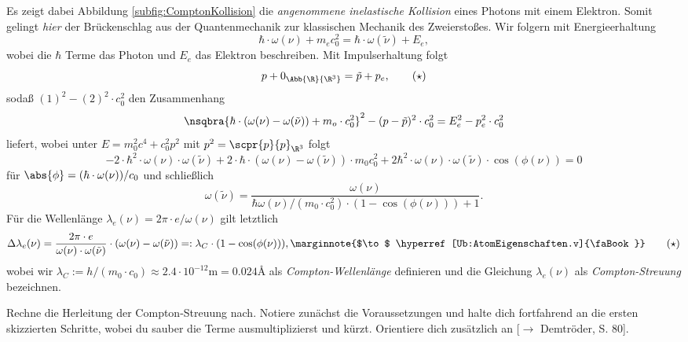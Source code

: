 \documentclass{article}
\begin{document}
        Es zeigt dabei Abbildung \ref{subfig:ComptonKollision} die \emph{angenommene inelastische Kollision} eines Photons mit einem Elektron. Somit gelingt \emph{hier} der Brückenschlag aus der Quantenmechanik zur klassischen Mechanik des Zweierstoßes. Wir folgern mit Energieerhaltung
        \[\hbar\cdot\omega(\nu) + m_ec_0^2 = \hbar\cdot\omega(\tilde\nu) + E_e,\tag{$\star$}\]
        wobei die $\hbar$ Terme das Photon und $E_e$ das Elektron beschreiben. Mit Impulserhaltung folgt
		\[p + 0_{\Abb{\R}{\R^3}} = \tilde p + p_e,\tag{$\star$}\]
        sodaß $(1)^2 - (2)^2\cdot c_0^2$ den Zusammenhang
        \[\nsqbra{\hbar\cdot(\omega(\nu)-\omega(\tilde\nu)) + m_o\cdot c_0^2}^2 - (p-\tilde p)^2\cdot c_0^2 = E_e^2 - p_e^2\cdot c_0^2\]
        liefert, wobei unter $E=m_0^2c^4+c_0^2p^2$ mit $p^2 = \scpr{p}{p}_{\R^3}$ folgt
        \[-2\cdot\hbar^2\cdot\omega(\nu)\cdot\omega(\tilde\nu) + 2\cdot\hbar\cdot(\omega(\nu)-\omega(\tilde\nu))\cdot m_0c_0^2 + 2\hbar^2\cdot\omega(\nu)\cdot\omega(\tilde\nu)\cdot\cos(\phi(\nu)) = 0\]
        für $\abs{\phi} = (\hbar\cdot\omega(\nu))/c_0$ und schließlich  
        \[\omega(\tilde\nu) = \frac{\omega(\nu)}{\hbar\omega(\nu)/(m_0\cdot c_0^2)\cdot (1-\cos(\phi(\nu))) + 1}.\tag{$\star$}\]
        Für die Wellenlänge $\lambda_e(\nu) = 2\pi\cdot e/\omega(\nu)$ gilt letztlich 
        \begin{align*}
            \Delta\lambda_e(\nu) = \frac{2\pi\cdot e}{\omega(\nu)\cdot\omega(\tilde\nu)}\cdot(\omega(\nu)-\omega(\tilde\nu)) =: \lambda_C\cdot (1-\cos(\phi(\nu))),\label{Ub:ComptonStreuung}\marginnote{$\to$ \hyperref[Ub:AtomEigenschaften.v]{\faBook}}\tag{$\star$}
        \end{align*}
        wobei wir $\lambda_C:=h/(m_0\cdot c_0)\approx 2.4\cdot 10^{-12}\si\metre = 0.024\si\angstrom$ als \emph{Compton-Wellenlänge} definieren und die Gleichung $\lambda_e(\nu)$ als \emph{Compton-Streuung} bezeichnen. 
        
        \begin{Aufgabe}
            \nr{} Rechne die Herleitung der Compton-Streuung nach. Notiere zunächst die Voraussetzungen und halte dich fortfahrend an die ersten skizzierten Schritte, wobei du sauber die Terme ausmultiplizierst und kürzt. Orientiere dich zusätzlich an [$\to$ Demtröder, S. 80].
        \end{Aufgabe}
\end{document}
